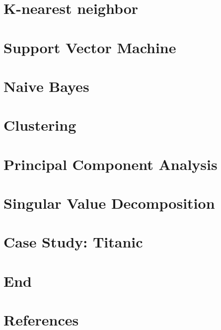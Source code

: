 \section[Knn]{K-nearest neighbor}




\section[SVM]{Support Vector Machine}



\section[NB]{Naive Bayes}




\section[Clust]{Clustering}




\section[PCA]{Principal Component Analysis}



\section[SVD]{Singular Value Decomposition}



\section[Case]{Case Study: Titanic}


\section[End]{End}




\section[Refs]{References}

 